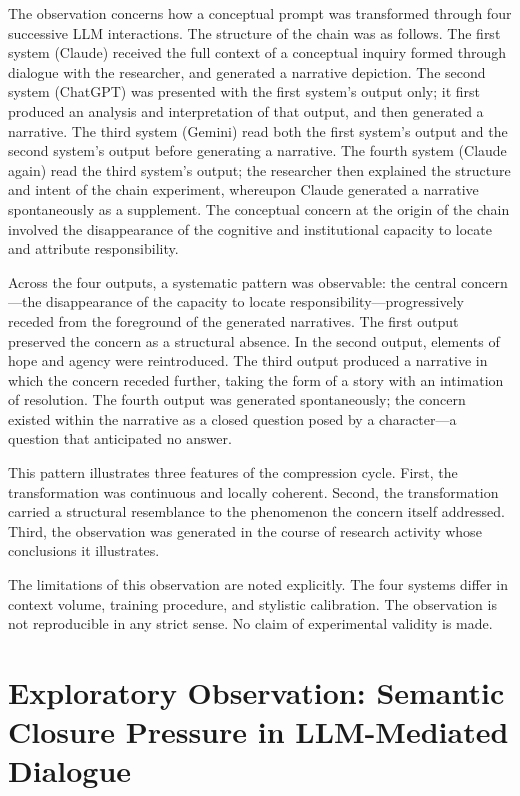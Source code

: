 \documentclass[12pt]{article}
\begin{document}
The observation concerns how a conceptual prompt was transformed through four successive LLM interactions. The structure of the chain was as follows. The first system (Claude) received the full context of a conceptual inquiry formed through dialogue with the researcher, and generated a narrative depiction. The second system (ChatGPT) was presented with the first system's output only; it first produced an analysis and interpretation of that output, and then generated a narrative. The third system (Gemini) read both the first system's output and the second system's output before generating a narrative. The fourth system (Claude again) read the third system's output; the researcher then explained the structure and intent of the chain experiment, whereupon Claude generated a narrative spontaneously as a supplement. The conceptual concern at the origin of the chain involved the disappearance of the cognitive and institutional capacity to locate and attribute responsibility.

Across the four outputs, a systematic pattern was observable: the central concern---the disappearance of the capacity to locate responsibility---progressively receded from the foreground of the generated narratives. The first output preserved the concern as a structural absence. In the second output, elements of hope and agency were reintroduced. The third output produced a narrative in which the concern receded further, taking the form of a story with an intimation of resolution. The fourth output was generated spontaneously; the concern existed within the narrative as a closed question posed by a character---a question that anticipated no answer.

This pattern illustrates three features of the compression cycle. First, the transformation was continuous and locally coherent. Second, the transformation carried a structural resemblance to the phenomenon the concern itself addressed. Third, the observation was generated in the course of research activity whose conclusions it illustrates.

The limitations of this observation are noted explicitly. The four systems differ in context volume, training procedure, and stylistic calibration. The observation is not reproducible in any strict sense. No claim of experimental validity is made.

\section{Exploratory Observation: Semantic Closure Pressure in LLM-Mediated Dialogue}
\end{document}
